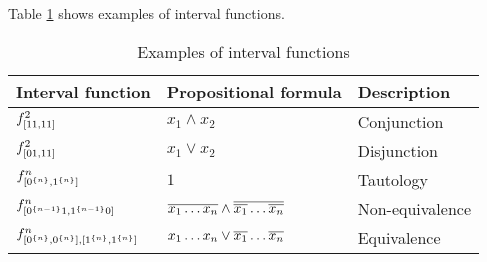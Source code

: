 Table \ref{table:exampleintfns} shows
examples of interval functions.

\begin{table}[h]
\label{table:exampleintfns}
\centering
\begin{tabular}{lll}
Interval function & Propositional formula & Description \\
\hline
$f^2_{[11, 11]}$ &
$x_1 \wedge x_2$ & Conjunction \\
$f^2_{[01, 11]}$ &
$x_1 \vee x_2$ & Disjunction \\
$f^n_{[0^{\{n\}}, 1^{\{n\}}]}$ &
$1$ & Tautology \\
$f^n_{[0^{\{n-1\}} 1, 1^{\{n-1\}} 0]}$ &
$\overline{x_1 \ldots x_n} \wedge
\overline{\overline{x_1} \ldots \overline{x_n}}$ &
Non-equivalence \\
$f^n_{[0^{\{n\}}, 0^{\{n\}}],
[1^{\{n\}}, 1^{\{n\}}]}$ &
$x_1 \ldots x_n \vee \overline{x_1} \ldots \overline{x_n}$ &
Equivalence
\end{tabular}
\caption{Examples of interval functions}
\end{table}
